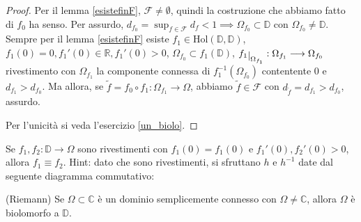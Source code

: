\begin{proof}
  Per il lemma \ref{esistefinF}, $\mathcal{F}\not=\emptyset$, quindi la costruzione che abbiamo fatto di $f_0$ ha senso. Per assurdo, $\displaystyle d_{f_0}=\sup_{f \in \mathcal{F}} d_f<1 \implies \Omega_{f_0} \subset \mathbb{D}$ con $\Omega_{f_0} \not= \mathbb{D}$.
  Sempre per il lemma \ref{esistefinF} esiste $f_1 \in \text{Hol}(\mathbb{D}, \mathbb{D})$, $f_1(0)=0, f_1'(0) \in \mathbb{R}, f_1'(0)>0$, $\Omega_{f_0} \subset f_1(\mathbb{D})$, $f_1\restrict{\Omega_{f_1}}:\Omega_{f_1} \longrightarrow \Omega_{f_0}$ rivestimento con $\Omega_{f_1}$ la componente connessa di $f_1^{-1}(\Omega_{f_0})$ contentente $0$ e $d_{f_1}>d_{f_0}$.
  Ma allora, se $\tilde{f}=f_0 \circ f_1:\Omega_{f_1} \longrightarrow \Omega$, abbiamo $\tilde{f} \in \mathcal{F}$ con $d_{\tilde{f}}=d_{f_1}>d_{f_0}$, assurdo.

  Per l'unicità si veda l'esercizio \ref{un_biolo}.
\end{proof}

\begin{exc} \label{un_biolo}
  Se $f_1, f_2:\mathbb{D} \longrightarrow \Omega$ sono rivestimenti con $f_1(0)=f_1(0)$ e $f_1'(0), f_2'(0)>0$, allora $f_1 \equiv f_2$. Hint: dato che sono rivestimenti, si sfruttano $h$ e $h^{-1}$ date dal seguente diagramma commutativo:
  \begin{center}
  \end{center}
\end{exc}

\begin{thm}
  (Riemann) Se $\Omega \subset \mathbb{C}$ è un dominio semplicemente connesso con $\Omega \not=\mathbb{C}$, allora $\Omega$ è biolomorfo a $\mathbb{D}$.
\end{thm}

